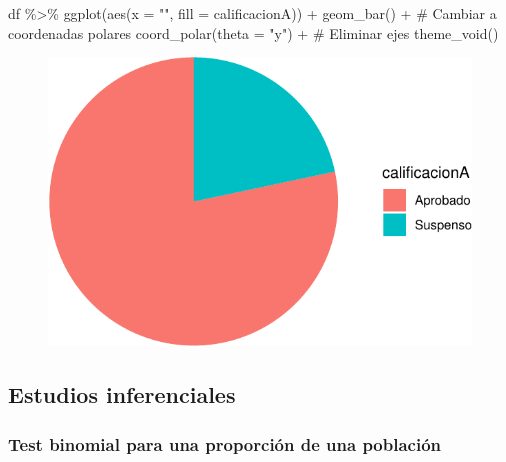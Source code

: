 \documentclass[
  a4paper,
]{scrreport}
\newenvironment{Shaded}{\begin{snugshade}}{\end{snugshade}}
\newcommand{\AttributeTok}[1]{\textcolor[rgb]{0.40,0.45,0.13}{#1}}
\newcommand{\CommentTok}[1]{\textcolor[rgb]{0.37,0.37,0.37}{#1}}
\newcommand{\FunctionTok}[1]{\textcolor[rgb]{0.28,0.35,0.67}{#1}}
\newcommand{\NormalTok}[1]{\textcolor[rgb]{0.00,0.23,0.31}{#1}}
\newcommand{\SpecialCharTok}[1]{\textcolor[rgb]{0.37,0.37,0.37}{#1}}
\newcommand{\StringTok}[1]{\textcolor[rgb]{0.13,0.47,0.30}{#1}}
\theoremstyle{definition}
\theoremstyle{definition}
\theoremstyle{remark}
\begin{document}
\begin{Shaded}
\begin{Highlighting}[]
\NormalTok{df }\SpecialCharTok{\%\textgreater{}\%} \FunctionTok{ggplot}\NormalTok{(}\FunctionTok{aes}\NormalTok{(}\AttributeTok{x =} \StringTok{""}\NormalTok{, }\AttributeTok{fill =}\NormalTok{ calificacionA)) }\SpecialCharTok{+} 
  \FunctionTok{geom\_bar}\NormalTok{() }\SpecialCharTok{+}
  \CommentTok{\# Cambiar a coordenadas polares}
  \FunctionTok{coord\_polar}\NormalTok{(}\AttributeTok{theta =} \StringTok{"y"}\NormalTok{) }\SpecialCharTok{+}
  \CommentTok{\# Eliminar ejes}
   \FunctionTok{theme\_void}\NormalTok{()}
\end{Highlighting}
\end{Shaded}

\begin{figure}[H]

{\centering \includegraphics{08-analisis-estadisticos_files/figure-pdf/unnamed-chunk-23-1.pdf}

}

\end{figure}

\hypertarget{estudios-inferenciales-1}{%
\subsection{Estudios inferenciales}\label{estudios-inferenciales-1}}

\hypertarget{test-binomial-para-una-proporciuxf3n-de-una-poblaciuxf3n}{%
\subsubsection{Test binomial para una proporción de una
población}\label{test-binomial-para-una-proporciuxf3n-de-una-poblaciuxf3n}}
\end{document}
